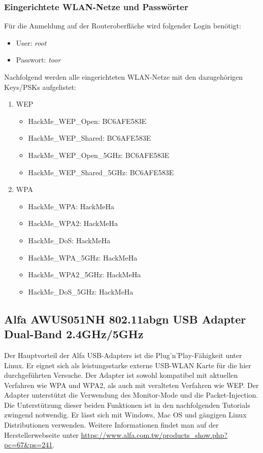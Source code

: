 \subsubsection{Eingerichtete WLAN-Netze und Passwörter}
Für die Anmeldung auf der Routeroberfläche wird folgender Login benötigt:
\begin{itemize}
	\item User: \textit{root}
	\item Passwort: \textit{toor}
\end{itemize}
Nachfolgend werden alle eingerichteten WLAN-Netze mit den dazugehörigen Keys/PSKs aufgelistet:
\begin{enumerate}
	\item {WEP}
	\begin{itemize}
			\item HackMe\_WEP\_Open: BC6AFE583E
			\item HackMe\_WEP\_Shared: BC6AFE583E
			\item HackMe\_WEP\_Open\_5GHz: BC6AFE583E
			\item HackMe\_WEP\_Shared\_5GHz: BC6AFE583E
	\end{itemize}
	\item {WPA}
	\begin{itemize}
		\item HackMe\_WPA: HackMeHa
		\item HackMe\_WPA2: HackMeHa
		\item HackMe\_DoS: HackMeHa
		\item HackMe\_WPA\_5GHz: HackMeHa
		\item HackMe\_WPA2\_5GHz: HackMeHa
		\item HackMe\_DoS\_5GHz: HackMeHa
	\end{itemize}
\end{enumerate}

\subsection{Alfa AWUS051NH 802.11abgn USB Adapter Dual-Band 2.4GHz/5GHz}

Der Hauptvorteil der Alfa USB-Adapters ist die Plug'n'Play-Fähigkeit unter Linux. Er eignet sich als leistungsstarke externe USB-WLAN Karte für die hier durchgeführten Versuche. Der Adapter ist sowohl kompatibel mit aktuellen Verfahren wie WPA und WPA2, als auch mit veralteten Verfahren wie WEP. Der Adapter unterstützt die Verwendung des Monitor-Mode und die Packet-Injection. Die Unterstützung dieser beiden Funktionen ist in den nachfolgenden Tutorials zwingend notwendig. Er lässt sich mit Windows, Mac OS und gängigen Linux Distributionen verwenden.
Weitere Informationen findet man auf der Herstellerwebseite unter \url{https://www.alfa.com.tw/products_show.php?pc=67&ps=241}.

